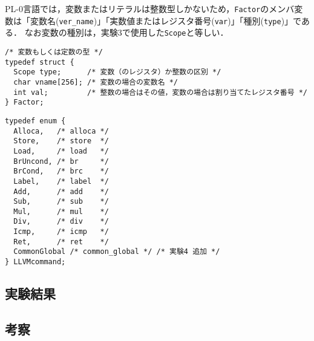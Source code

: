 \documentclass[uplatex]{jsarticle}
\begin{document}
PL-0言語では，変数またはリテラルは整数型しかないため，\verb#Factor#のメンバ変数は「変数名(\verb#ver_name#)」「実数値またはレジスタ番号(\verb#var#)」「種別(\verb#type#)」である．
なお変数の種別は，実験3で使用した\verb#Scope#と等しい．

\begin{lstlisting}[caption=変数および実数値を表す構造体Factor,label=lst:ex4:llvm.h:factor]
/* 変数もしくは定数の型 */
typedef struct {
  Scope type;      /* 変数（のレジスタ）か整数の区別 */
  char vname[256]; /* 変数の場合の変数名 */
  int val;         /* 整数の場合はその値，変数の場合は割り当てたレジスタ番号 */
} Factor;
\end{lstlisting}

\begin{lstlisting}[caption=LLVMコマンドを表す列挙型LLVMcommand,label=lst:ex4:llvm.h:llvmcommand]
typedef enum {
  Alloca,   /* alloca */
  Store,    /* store  */
  Load,     /* load   */
  BrUncond, /* br     */
  BrCond,   /* brc    */
  Label,    /* label  */
  Add,      /* add    */
  Sub,      /* sub    */
  Mul,      /* mul    */
  Div,      /* div    */
  Icmp,     /* icmp   */
  Ret,      /* ret    */
  CommonGlobal /* common_global */ /* 実験4 追加 */
} LLVMcommand;
\end{lstlisting}
\subsection{実験結果}

\subsection{考察}
\end{document}
